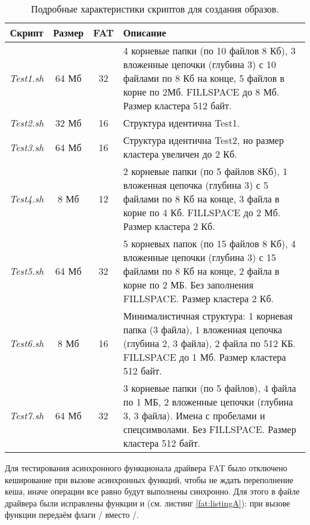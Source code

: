 \begin{table}[htbp]
	\renewcommand{\arraystretch}{1.5}
	\centering
	\begin{tabular}{|c|c|c|p{10cm}|}
		\hline
		\textbf{Скрипт} & \textbf{Размер} & \textbf{FAT} & \textbf{Описание} \\
		\hline
		\textit{Test1.sh} & 64 Мб & 32 &   4 корневые папки (по 10 файлов 8 Кб), 3 вложенные цепочки (глубина 3) с 10 файлами по 8 Кб на конце, 5 файлов в корне по  2Мб. FILLSPACE до 8 Мб. Размер кластера 512 байт. \\
		\hline
		\textit{Test2.sh} & 32 Мб & 16 &   Структура идентична Test1. \\
		\hline
		\textit{Test3.sh} & 64 Мб & 16 &  Структура идентична Test2, но размер кластера увеличен до 2 Кб.\\
		\hline
		\textit{Test4.sh} & 8 Мб & 12 &  2 корневые папки (по 5 файлов 8Кб), 1 вложенная цепочка (глубина 3) с 5 файлами по 8 Кб на конце,  3 файла в корне по 4 Кб. FILLSPACE до 2 Мб. Размер кластера 2 Кб. \\
		\hline
		\textit{Test5.sh} & 64 Мб & 32 &  5 корневых папок (по 15 файлов 8 Кб), 4 вложенные цепочки (глубина 3) с 15 файлами по 8 Кб на конце, 2 файла  в корне по 2 МБ. Без заполнения FILLSPACE.  Размер кластера 2 Кб.\\
		\hline
		\textit{Test6.sh} & 8 Мб & 16 &  Минималистичная структура: 1 корневая папка (3 файла), 1 вложенная цепочка (глубина 2, 3 файла), 2 файла по 512 КБ.  FILLSPACE до 1 Мб. Размер кластера 512 байт.\\
		\hline
		\textit{Test7.sh} & 64 Мб & 32 & 3 корневые папки (по 5 файлов), 4 файла по 1 МБ, 2 вложенные цепочки (глубина 3, 3 файла). Имена с пробелами и спецсимволами. Без FILLSPACE. Размер кластера 512 байт.  \\
		\hline
		
	\end{tabular}
	\caption{Подробные характеристики скриптов для создания образов.}
	\label{fat:tab:test_detail}
\end{table}

Для тестирования асинхронного функционала драйвера FAT было отключено кеширование при вызове асинхронных функций, чтобы не ждать переполнение кеша, иначе операции все равно будут выполнены синхронно. Для этого в файле  драйвера были исправлены функции  и  (см. листинг \ref{fat:listingA}): при вызове функции  передаём флаги / вместо /.
 


